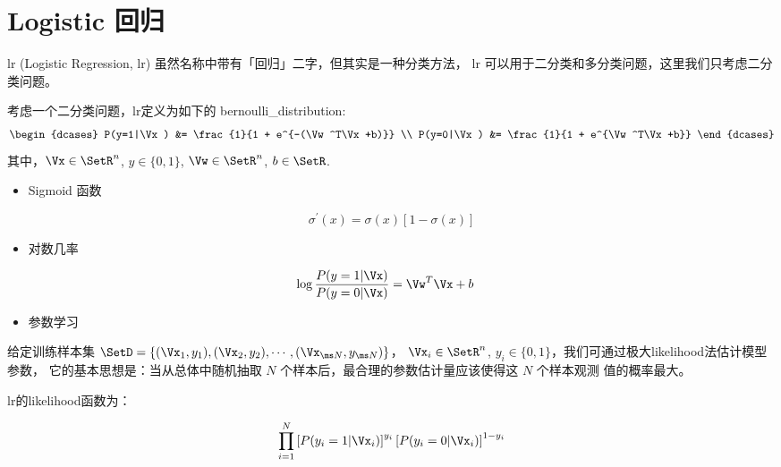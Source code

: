 
\section{Logistic 回归}

\gls{lr} (Logistic Regression, lr) 虽然名称中带有「回归」二字，但其实是一种分类方法，
\gls{lr} 可以用于二分类和多分类问题，这里我们只考虑二分类问题。

考虑一个二分类问题，\gls{lr}定义为如下的 \gls{bernoulli_distribution}:
\begin{equation} \label{math:lr}
	\begin{dcases}
		P(y=1|\Vx) &= \frac{1}{1 + e^{-(\Vw^T\Vx+b)}} \\
		P(y=0|\Vx) &= \frac{1}{1 + e^{\Vw^T\Vx+b}} 
	\end{dcases}
\end{equation}
其中，$\Vx \in \SetR^n$, $y \in \{0, 1\}$, $\Vw \in \SetR^n$, $b \in \SetR$.



\begin{itemize}
  \item Sigmoid 函数
\end{itemize}

\begin{equation}
	\sigma^{'}(x) = \sigma(x)[1-\sigma(x)]
\end{equation}


\begin{itemize}
  \item 对数几率
\end{itemize}

\begin{align}
	\log \frac{P(y=1|\Vx)}{P(y=0|\Vx)} &= \Vw^T\Vx+b
	\label{logistic_prob}
\end{align}


\begin{itemize}
  \item 参数学习
\end{itemize}

给定训练样本集 $\SetD = \{(\Vx_1, y_1), (\Vx_2, y_2), \cdots, (\Vx_{\ms N}, y_{\ms N})\}$，
$\Vx_i \in \SetR^n$, $y_i \in \{0, 1\}$，我们可通过极大\gls{likelihood}法估计模型参数，
它的基本思想是：当从总体中随机抽取 $N$ 个样本后，最合理的参数估计量应该使得这 $N$ 个样本观测
值的概率最大。

\gls{lr}的\gls{likelihood}函数为：

\begin{equation}
	\prod_{i = 1}^N \left[P(y_i = 1 | \Vx_i)\right]^{y_i} \left[P(y_i = 0 | \Vx_i)\right]^{1 - y_i} 
\end{equation}

